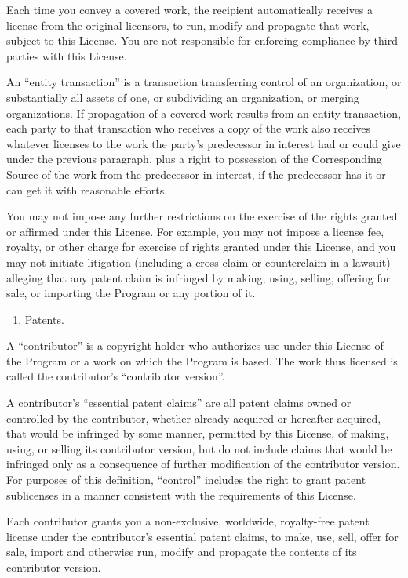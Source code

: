 \documentclass[letterpaper,10pt,english]{sphinxmanual}
\begin{document}
Each time you convey a covered work, the recipient automatically
receives a license from the original licensors, to run, modify and
propagate that work, subject to this License.  You are not responsible
for enforcing compliance by third parties with this License.

An “entity transaction” is a transaction transferring control of an
organization, or substantially all assets of one, or subdividing an
organization, or merging organizations.  If propagation of a covered
work results from an entity transaction, each party to that
transaction who receives a copy of the work also receives whatever
licenses to the work the party’s predecessor in interest had or could
give under the previous paragraph, plus a right to possession of the
Corresponding Source of the work from the predecessor in interest, if
the predecessor has it or can get it with reasonable efforts.

You may not impose any further restrictions on the exercise of the
rights granted or affirmed under this License.  For example, you may
not impose a license fee, royalty, or other charge for exercise of
rights granted under this License, and you may not initiate litigation
(including a cross-claim or counterclaim in a lawsuit) alleging that
any patent claim is infringed by making, using, selling, offering for
sale, or importing the Program or any portion of it.
\begin{enumerate}
%
\setcounter{enumi}{10}
\item {} 
Patents.

\end{enumerate}

A “contributor” is a copyright holder who authorizes use under this
License of the Program or a work on which the Program is based.  The
work thus licensed is called the contributor’s “contributor version”.

A contributor’s “essential patent claims” are all patent claims
owned or controlled by the contributor, whether already acquired or
hereafter acquired, that would be infringed by some manner, permitted
by this License, of making, using, or selling its contributor version,
but do not include claims that would be infringed only as a
consequence of further modification of the contributor version.  For
purposes of this definition, “control” includes the right to grant
patent sublicenses in a manner consistent with the requirements of
this License.

Each contributor grants you a non-exclusive, worldwide, royalty-free
patent license under the contributor’s essential patent claims, to
make, use, sell, offer for sale, import and otherwise run, modify and
propagate the contents of its contributor version.
\end{document}
